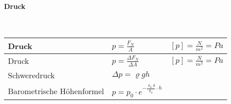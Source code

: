 \paragraph{Druck}\mbox{}\\
\begin{tabularx}{\columnwidth}{@{}XXX@{}}
	Druck & $p = \frac{F_N}{A}$ & $[p] = \frac{N}{m^2} = Pa$ \\ \hline                                                            
	Druck & $p = \frac{\Delta F_N}{\Delta A}$ & $[p] = \frac{N}{m^2} = Pa$ \\ \hline                                                            
	Schweredruck & $\Delta p = \varrho gh$ \\ \hline
	Barometrische Höhenformel & $p = p_0 \cdot e^{-\frac{\varrho_0g}{p_0}\cdot h}$ \\ \hline
\end{tabularx}